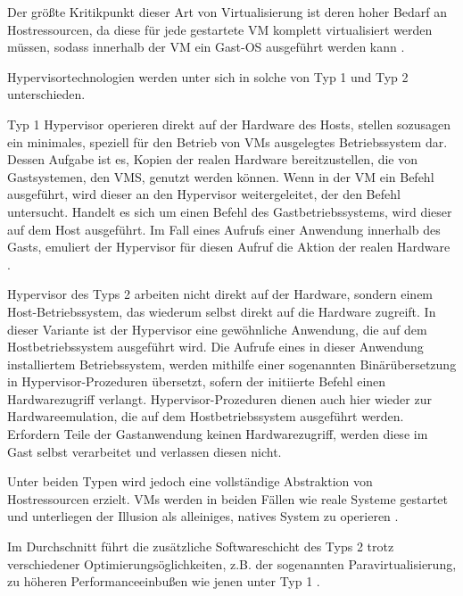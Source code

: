 \documentclass[../main.tex]{subfiles}
\begin{document}
      Der größte Kritikpunkt dieser Art von Virtualisierung ist deren hoher Bedarf an Hostressourcen, da diese für jede gestartete \acrshort{VM} komplett virtualisiert werden müssen, sodass innerhalb der \acrshort{VM} ein Gast-\acrshort{OS} ausgeführt werden kann \cite[S.1]{dockerIntroIEEE}\cite[S.3]{dockerLXCKub}.

      Hypervisortechnologien werden unter sich in solche von Typ 1 und Typ 2 unterschieden.

			Typ 1 Hypervisor operieren direkt auf der Hardware des Hosts, stellen sozusagen ein minimales, speziell für den Betrieb von VMs ausgelegtes Betriebssystem dar. Dessen Aufgabe ist es, Kopien der realen Hardware bereitzustellen, die von Gastsystemen, den VMS, genutzt werden können. Wenn in der VM ein Befehl ausgeführt, wird dieser an den Hypervisor weitergeleitet, der den Befehl untersucht. Handelt es sich um einen Befehl des Gastbetriebssystems, wird dieser auf dem Host ausgeführt. Im Fall eines Aufrufs einer Anwendung innerhalb des Gasts, emuliert der Hypervisor für diesen Aufruf die Aktion der realen Hardware \cite[S.663ff.]{tanenbaumOS}.

			Hypervisor des Typs 2 arbeiten nicht direkt auf der Hardware, sondern einem Host-Betriebssystem, das wiederum selbst direkt auf die Hardware zugreift. In dieser Variante ist der Hypervisor eine gewöhnliche Anwendung, die auf dem Hostbetriebssystem ausgeführt wird. Die Aufrufe eines in dieser Anwendung installiertem Betriebssystem, werden mithilfe einer sogenannten Binärübersetzung in Hypervisor-Prozeduren übersetzt, sofern der initiierte Befehl einen Hardwarezugriff verlangt. Hypervisor-Prozeduren dienen auch hier wieder zur Hardwareemulation, die auf dem Hostbetriebssystem ausgeführt werden. Erfordern Teile der Gastanwendung keinen Hardwarezugriff, werden diese im Gast selbst verarbeitet und verlassen diesen nicht.

			Unter beiden Typen wird jedoch eine vollständige Abstraktion von Hostressourcen erzielt. VMs werden in beiden Fällen wie reale Systeme gestartet und unterliegen der Illusion als alleiniges, natives System zu operieren \cite[S.665f.]{tanenbaumOS}.

			Im Durchschnitt führt die zusätzliche Softwareschicht des Typs 2 trotz verschiedener Optimierungsöglichkeiten, z.B. der sogenannten Paravirtualisierung, zu höheren Performanceeinbußen wie jenen unter Typ 1 \cite[S.666f.]{tanenbaumOS}\cite[S.2]{dockerSec1}.

\end{document}
